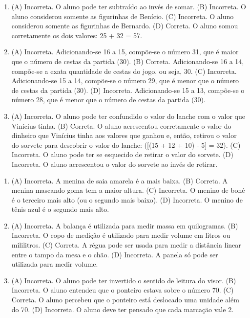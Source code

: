 \begin{enumerate}
\item
(A)  Incorreta. O aluno pode ter subtraído ao invés de somar.
(B)  Incorreta. O aluno considerou somente as figurinhas de Benício.
(C)  Incorreta. O aluno considerou somente as figurinhas de Bernardo.
(D)  Correta. O aluno somou corretamente os dois valores: 25 + 32 = 57.

\item
(A) Incorreta. Adicionando-se 16 a 15, compõe-se o número 31, que é maior que o número de cestas da partida (30).
(B) Correta. Adicionando-se 16 a 14, compõe-se a exata quantidade de cestas do jogo, ou seja, 30.
(C) Incorreta. Adicionando-se 15 a 14, compõe-se o número 29, que é menor que o número de cestas da partida (30).
(D) Incorreta. Adicionando-se 15 a 13, compõe-se o número 28, que é menor que o número de cestas da partida (30).

\item
(A)  Incorreta. O aluno pode ter confundido o valor do lanche com o valor
  que Vinícius tinha.
(B)  Correta. O aluno acrescentou corretamente o valor do dinheiro que Vinícius tinha
  aos valores que ganhou e, então, retirou o valor do sorvete para
  descobrir o valor do lanche: ([(15 + 12 + 10) - 5] = 32).
(C)  Incorreta. O aluno pode ter se esquecido de retirar o valor do sorvete.
(D)  Incorreta. O aluno acrescentou o valor do sorvete ao invés de retirar.
\end{enumerate}


\begin{enumerate}
\item
(A) Incorreta. A menina de saia amarela é a mais baixa.
(B) Correta. A menina mascando goma tem a maior altura.
(C) Incorreta. O menino de boné é o terceiro mais alto (ou o segundo mais
baixo).
(D) Incorreta. O menino de tênis azul é o segundo mais alto.

\item
(A) Incorreta. A balança é utilizada para medir massa em quilogramas.
(B) Incorreta. O copo de medição é utilizado para medir volume em litros ou mililitros.
(C) Correta. A régua pode ser usada para medir a distância linear entre o tampo da mesa e o chão.
(D) Incorreta. A panela só pode ser utilizada para medir volume.

\item
(A) Incorreta. O aluno pode ter invertido o sentido de leitura do visor.
(B) Incorreta. O aluno entendeu que o ponteiro estava sobre o número 70.
(C) Correta. O aluno percebeu que o ponteiro está deslocado uma unidade
além do 70.
(D) Incorreta. O aluno deve ter pensado que cada marcação vale 2.
\end{enumerate}

